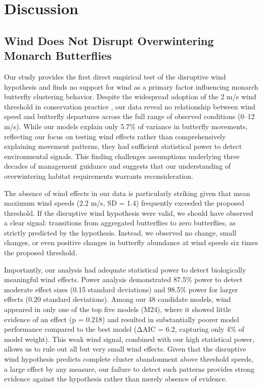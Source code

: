 \section{Discussion}

\subsection{Wind Does Not Disrupt Overwintering Monarch Butterflies}

Our study provides the first direct empirical test of the disruptive wind hypothesis and finds no support for wind as a primary factor influencing monarch butterfly clustering behavior. Despite the widespread adoption of the 2 m/s wind threshold in conservation practice \autocite{xercesGuideWesternMonarch2025}, our data reveal no relationship between wind speed and butterfly departures across the full range of observed conditions (0--12 m/s). While our models explain only 5.7\% of variance in butterfly movements, reflecting our focus on testing wind effects rather than comprehensively explaining movement patterns, they had sufficient statistical power to detect environmental signals. This finding challenges assumptions underlying three decades of management guidance and suggests that our understanding of overwintering habitat requirements warrants reconsideration.

The absence of wind effects in our data is particularly striking given that mean maximum wind speeds (2.2 m/s, SD = 1.4) frequently exceeded the proposed threshold. If the disruptive wind hypothesis were valid, we should have observed a clear signal: transitions from aggregated butterflies to zero butterflies, as strictly predicted by the hypothesis. Instead, we observed no change, small changes, or even positive changes in butterfly abundance at wind speeds six times the proposed threshold. 

Importantly, our analysis had adequate statistical power to detect biologically meaningful wind effects. Power analysis demonstrated 87.5\% power to detect moderate effect sizes (0.15 standard deviations) and 98.5\% power for larger effects (0.20 standard deviations). Among our 48 candidate models, wind appeared in only one of the top five models (M24), where it showed little evidence of an effect (p = 0.218) and resulted in substantially poorer model performance compared to the best model (ΔAIC = 6.2, capturing only 4\% of model weight). This weak wind signal, combined with our high statistical power, allows us to rule out all but very small wind effects. Given that the disruptive wind hypothesis predicts complete cluster abandonment above threshold speeds, a large effect by any measure, our failure to detect such patterns provides strong evidence against the hypothesis rather than merely absence of evidence.

